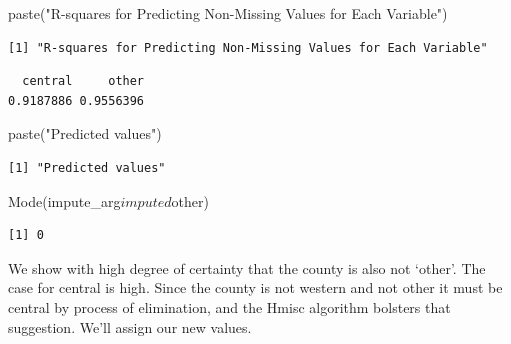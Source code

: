 \documentclass[]{article}
\newenvironment{Shaded}{}{}
\newcommand{\KeywordTok}[1]{\textcolor[rgb]{0.00,0.00,1.00}{#1}}
\newcommand{\NormalTok}[1]{#1}
\newcommand{\OperatorTok}[1]{#1}
\newcommand{\StringTok}[1]{\textcolor[rgb]{0.00,0.50,0.50}{#1}}
\begin{document}
\begin{Shaded}
\begin{Highlighting}[]
\KeywordTok{paste}\NormalTok{(}\StringTok{"R-squares for Predicting Non-Missing Values for Each Variable"}\NormalTok{)}
\end{Highlighting}
\end{Shaded}

\begin{verbatim}
[1] "R-squares for Predicting Non-Missing Values for Each Variable"
\end{verbatim}

\begin{Shaded}
\end{Shaded}

\begin{verbatim}
  central     other 
0.9187886 0.9556396 
\end{verbatim}

\begin{Shaded}
\begin{Highlighting}[]
\KeywordTok{paste}\NormalTok{(}\StringTok{"Predicted values"}\NormalTok{)}
\end{Highlighting}
\end{Shaded}

\begin{verbatim}
[1] "Predicted values"
\end{verbatim}

\begin{Shaded}
\begin{Highlighting}[]
\KeywordTok{Mode}\NormalTok{(impute_arg}\OperatorTok{$}\NormalTok{imputed}\OperatorTok{$}\NormalTok{other)}
\end{Highlighting}
\end{Shaded}

\begin{verbatim}
[1] 0
\end{verbatim}

We show with high degree of certainty that the county is also not
`other'. The case for central is high. Since the county is not western
and not other it must be central by process of elimination, and the
Hmisc algorithm bolsters that suggestion. We'll assign our new values.
\end{document}
